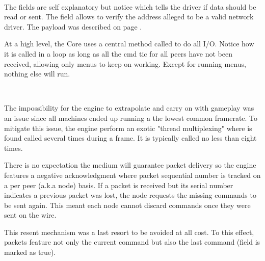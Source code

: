  \label{doomcom_t.c} \\
\par
\vspace{-10pt}
The fields are self explanatory but notice  which tells the driver if data should be read or sent. The  field allows \doom{} to verify the address alleged to be a valid network driver. The  payload was described on page \pageref{cmd_t_type}.



At a high level, the Core uses a central method called  to do all I/O. Notice how it is called in a loop as long as all the cmd tic for all peers have not been received, allowing only menus to keep on working. Except for running menus, nothing else will run.\\
\par
{}\\
\par
The impossibility for the engine to extrapolate and carry on with gameplay was an issue since all machines ended up running a the lowest common framerate. To mitigate this issue, the engine perform an exotic "thread multiplexing" where  is found called several times during a frame. It is typically called no less than eight times.\\
\par
{}



There is no expectation the medium will guarantee packet delivery so the engine features a negative acknowledgment where packet sequential number is tracked on a per peer (a.k.a node) basis. If a packet is received but its serial number indicates a previous packet was lost, the node requests the missing commands to be sent again. This meant each node cannot discard commands once they were sent on the wire.\\
\par
This resent mechanism was a last resort to be avoided at all cost. To this effect, packets feature not only the current command but also the last command (field  is marked as true).\\





